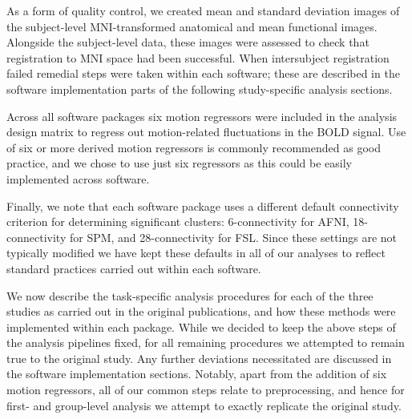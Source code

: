 As a form of quality control, we created mean and standard deviation images of the subject-level MNI-transformed anatomical and mean functional images. Alongside the subject-level data, these images were assessed to check that registration to MNI space had been successful. When intersubject registration failed remedial steps were taken within each software; these are described in the software implementation parts of the following study-specific analysis sections. 

Across all software packages six motion regressors were included in the analysis design matrix to regress out motion-related fluctuations in the BOLD signal. Use of six or more derived motion regressors is commonly recommended as good practice, and we chose to use just six regressors as this could be easily implemented across software. 

Finally, we note that each software package uses a different default connectivity criterion for determining significant clusters: 6-connectivity for AFNI, 18-connectivity for SPM, and 28-connectivity for FSL. Since these settings are not typically modified we have kept these defaults in all of our analyses to reflect standard practices carried out within each software. 

We now describe the task-specific analysis procedures for each of the three studies as carried out in the original publications, and how these methods were implemented within each package. While we decided to keep the above steps of the analysis pipelines fixed, for all remaining procedures we attempted to remain true to the original study. Any further deviations necessitated are discussed in the software implementation sections. Notably, apart from the addition of six motion regressors, all of our common steps relate to preprocessing, and hence for first- and group-level analysis we attempt to exactly replicate the original study. 

